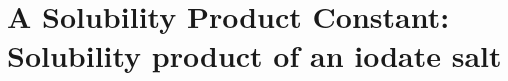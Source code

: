 \documentclass{book}
\begin{document}
 
 
  \newcommand\chapterlabel{}\newcommand\ChapterNameLabel{}\newcommand\labname{}\newcommand\chapterpathtocontent{}\newcommand\chapterpathtoimages{}\newcommand\chapterpath{} 

\section{A Solubility Product Constant: Solubility product of an iodate salt}
\renewcommand\chapterlabel{Ch-solubility}\renewcommand\ChapterNameLabel{\chapterlabel}\renewcommand\labname{solubilityproduct}\renewcommand\chapterpathtocontent{../../}\renewcommand\chapterpathtoimages{\chapterpathtocontent}\renewcommand\chapterpath{../../\chapterlabel/LAB-\labname/}


 
\end{document}
